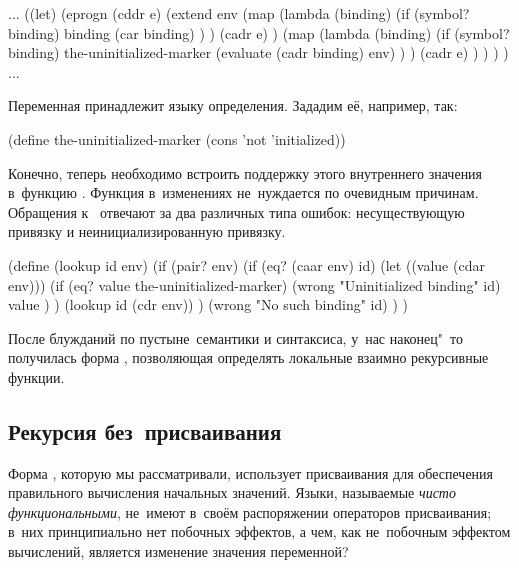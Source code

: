 \begin{code:lisp}
...
((let)
 (eprogn (cddr e)
         (extend env
                 (map (lambda (binding)
                        (if (symbol? binding) binding
                            (car binding) ) )
                      (cadr e) )
                 (map (lambda (binding)
                        (if (symbol? binding) the-uninitialized-marker
                            (evaluate (cadr binding) env) ) )
                      (cadr e) ) ) ) ) ...
\end{code:lisp}

Переменная  принадлежит языку определения. Зададим
её, например, так:

\begin{code:lisp}
(define the-uninitialized-marker (cons 'not 'initialized))
\end{code:lisp}

Конечно, теперь необходимо встроить поддержку этого внутреннего значения
в~функцию . Функция  в~изменениях не~нуждается по
очевидным причинам. Обращения к~ отвечают за два различных типа
ошибок: несуществующую привязку и неинициализированную привязку.

\begin{code:lisp}
(define (lookup id env)
  (if (pair? env)
      (if (eq? (caar env) id)
          (let ((value (cdar env)))
            (if (eq? value the-uninitialized-marker)
                (wrong "Uninitialized binding" id)
                value ) )
          (lookup id (cdr env)) )
      (wrong "No such binding" id) ) )
\end{code:lisp}

После блужданий по пустыне~семантики и синтаксиса, у~нас наконец"~то получилась
форма , позволяющая определять локальные взаимно рекурсивные функции.


\subsection{Рекурсия без~присваивания}%
\label{lisp1-2-omega/recusion/ssect:no-assignment}

Форма , которую мы рассматривали, использует присваивания для
обеспечения правильного вычисления начальных значений. Языки, называемые
\emph{чисто функциональными}, не~имеют в~своём распоряжении операторов
присваивания; в~них принципиально нет побочных эффектов, а чем, как
не~побочным эффектом вычислений, является изменение значения переменной?

